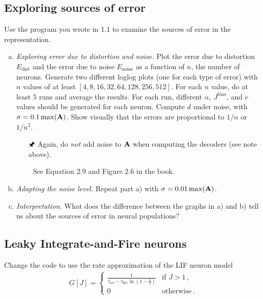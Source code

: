 	\subsection{Exploring sources of error}

	Use the program you wrote in 1.1 to examine the sources of error in the representation.

	\begin{enumerate}[a)]
		\item {} \textit{Exploring error due to distortion and noise.} Plot the error due to distortion $E_\mathrm{dist}$ and the error due to noise $E_\mathrm{noise}$ as a function of $n$, the number of neurons. Generate two different loglog plots (one for each type of error) with $n$ values of at least $[4, 8, 16, 32, 64, 128, 256, 512]$. For each $n$ value, do at least $5$ runs and average the results. For each run, different $\alpha$, $J^\mathrm{bias}$, and $e$ values should be generated for each neuron. Compute $d$ under noise, with $\sigma = 0.1 \max({\mathbf{A}})$. Show visually that the errors are proportional to $1/n$ or $1/n^2$.
		\begin{itemize}
			\item[{\symbolfont 🖈}] Again, do \textit{not} add noise to ${\mathbf{A}}$ when computing the decoders (see note above).
			\item[{\symbolfont 📖}] See Equation 2.9 and Figure 2.6 in the book.
		\end{itemize}
		\item {} \textit{Adapting the noise level.} Repeat part a) with $\sigma = 0.01 \max({\mathbf{A}})$.
		\item {} \textit{Interpretation.} What does the difference between the graphs in a) and b) tell us about the sources of error in neural populations?
	\end{enumerate}

	\subsection{Leaky Integrate-and-Fire neurons}

	Change the code to use the rate approximation of the LIF neuron model
	\begin{align*}
		G[J] = \begin{cases} {\frac{1}{\tau_\mathrm{ref}-\tau_\mathrm{RC}\ln(1-\frac{1}J)}} &\mbox{if } J > 1 \,, \\ 0 &\mbox{otherwise} \,.\end{cases}
	\end{align*}

